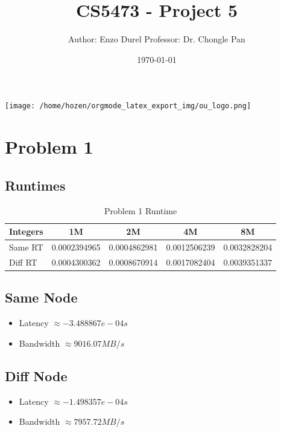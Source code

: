 \documentclass[11pt]{article}
\author{Author: Enzo Durel \newline Professor: Dr. Chongle Pan}
\date{\today}
\title{CS5473 - Project 5}
\begin{document}
\maketitle
\begin{center}
\texttt{[image: /home/hozen/orgmode\_latex\_export\_img/ou\_logo.png]}
\end{center}
\thispagestyle{empty}
\setcounter{tocdepth}{2}
\tableofcontents
\clearpage
{}
\thispagestyle{empty}
\listoftables
\clearpage
{} 
\newpage
\section{Problem 1}
\label{sec:orgc1cffa7}

\subsection{Runtimes}
\label{sec:orgdb87da5}

\begin{table}[htbp]
\caption{Problem 1 Runtime}
\centering
\begin{tabular}{|l|c|c|c||c|}
\hline
Integers & 1M & 2M & 4M & 8M\\
\hline
Same RT & 0.0002394965 & 0.0004862981 & 0.0012506239 & 0.0032828204\\
\hline
Diff RT & 0.0004300362 & 0.0008670914 & 0.0017082404 & 0.0039351337\\
\hline
\end{tabular}
\end{table}
\subsection{Same Node}
\label{sec:orga34ba45}

\begin{itemize}
\item Latency \(\approx -3.488867e-04 s\)
\item Bandwidth \(\approx 9016.07 MB/s\)
\end{itemize}
\subsection{Diff Node}
\label{sec:orgd9fb1bd}

\begin{itemize}
\item Latency \(\approx -1.498357e-04 s\)
\item Bandwidth \(\approx 7957.72 MB/s\)
\end{itemize}
\end{document}
